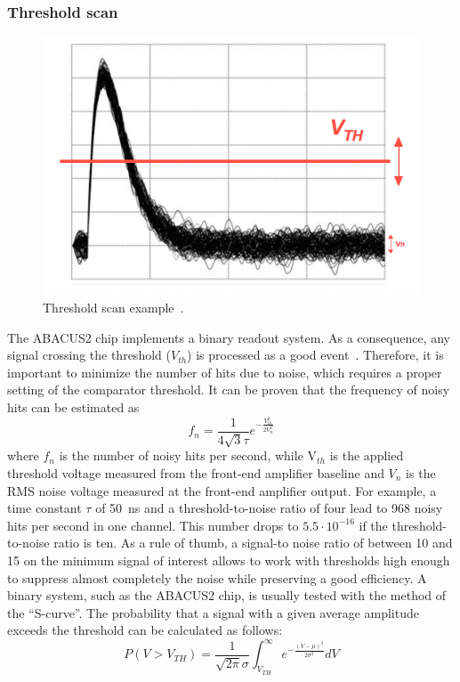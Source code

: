 \subsubsection{Threshold scan}\label{considerations}
\begin{figure}[H]
	\centering
	\includegraphics[width=0.7\linewidth]{IMG/ch5/DataDacConfig/tscan_sketch2}
	\caption{Threshold scan example~\cite{rivetti}.}
	\label{fig:tscansketch}
\end{figure}
\noindent The ABACUS2 chip implements a binary readout system. As a consequence, any signal crossing the threshold ($V_{th}$) is processed as a good event~\cite{rivetti}.
Therefore, it is important to minimize the number of hits due to noise, which requires a proper setting of the comparator threshold. It can be proven that the frequency of noisy hits can be estimated as
\begin{equation}
	f_n=\frac{1}{4 \sqrt{3} \tau} e^{- \frac{V^2_{th}}{2V^2_n}} 
\end{equation}
\noindent where $f_n$ is the number of noisy hits per second, while V$_{th}$ is the applied threshold voltage measured from the front-end amplifier baseline and $V_{n}$ is the RMS noise voltage measured at the front-end amplifier output.
For example, a time constant $\tau$ of 50~ns and a threshold-to-noise ratio of four lead to 968 noisy hits per second in one channel.
This number drops to $5.5\cdot10^{-16}$ if the threshold-to-noise ratio is ten.
As a rule of thumb, a signal-to noise ratio of between 10 and 15 on the minimum signal of interest allows to work with thresholds high enough to suppress almost completely the noise while preserving a good efficiency.
A binary system, such as the ABACUS2 chip, is usually tested with the method of the “S-curve”.
The probability that a signal with a given average amplitude exceeds
the threshold can be calculated as follows:
\begin{equation}
	P(V>V_{TH}) = \frac{1}{\sqrt{2\pi}\sigma} \int_{V_{TH}}^{\infty} e^{- \frac{(V-\mu)^2}{2\sigma^2}} dV
\end{equation}
